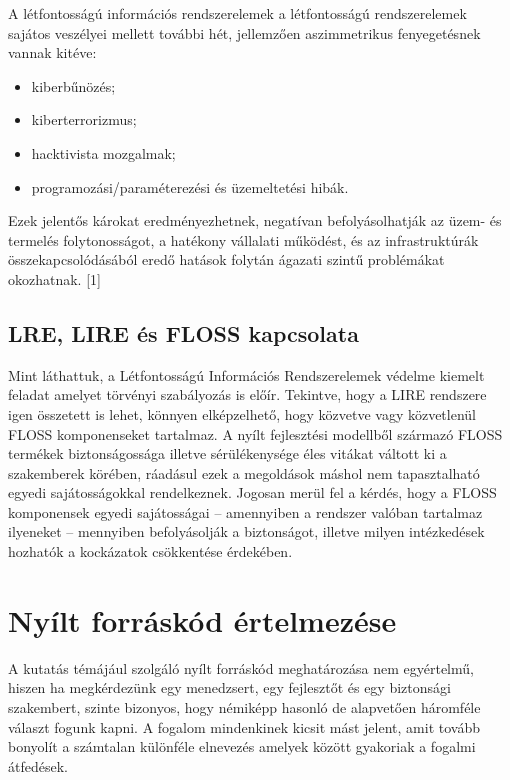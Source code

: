 \documentclass[12pt,magyar,a4paper,oneside]{scrreprt}
\providecommand{\tightlist}{%
  \setlength{\itemsep}{0pt}\setlength{\parskip}{0pt}}
\begin{document}
A létfontosságú információs rendszerelemek a létfontosságú
rendszerelemek sajátos veszélyei mellett további hét, jellemzően
aszimmetrikus fenyegetésnek vannak kitéve:

\begin{itemize}
\tightlist
\item
  kiberbűnözés;
\item
  kiberterrorizmus;
\item
  hacktivista mozgalmak;
\item
  programozási/paraméterezési és üzemeltetési hibák.
\end{itemize}

Ezek jelentős károkat eredményezhetnek, negatívan befolyásolhatják az
üzem- és termelés folytonosságot, a hatékony vállalati működést, és az
infrastruktúrák összekapcsolódásából eredő hatások folytán ágazati
szintű problémákat okozhatnak. {[}1{]}

\hypertarget{lre-lire-uxe9s-floss-kapcsolata}{%
\subsection{LRE, LIRE és FLOSS
kapcsolata}\label{lre-lire-uxe9s-floss-kapcsolata}}

Mint láthattuk, a Létfontosságú Információs Rendszerelemek védelme
kiemelt feladat amelyet törvényi szabályozás is előír. Tekintve, hogy a
LIRE rendszere igen összetett is lehet, könnyen elképzelhető, hogy
közvetve vagy közvetlenül FLOSS komponenseket tartalmaz. A nyílt
fejlesztési modellből származó FLOSS termékek biztonságossága illetve
sérülékenysége éles vitákat váltott ki a szakemberek körében, ráadásul
ezek a megoldások máshol nem tapasztalható egyedi sajátosságokkal
rendelkeznek. Jogosan merül fel a kérdés, hogy a FLOSS komponensek
egyedi sajátosságai -- amennyiben a rendszer valóban tartalmaz ilyeneket
-- mennyiben befolyásolják a biztonságot, illetve milyen intézkedések
hozhatók a kockázatok csökkentése érdekében.

\hypertarget{sec:WhatIsFLOSS}{%
\section{Nyílt forráskód értelmezése}\label{sec:WhatIsFLOSS}}

A kutatás témájául szolgáló nyílt forráskód meghatározása nem
egyértelmű, hiszen ha megkérdezünk egy menedzsert, egy fejlesztőt és egy
biztonsági szakembert, szinte bizonyos, hogy némiképp hasonló de
alapvetően háromféle választ fogunk kapni. A fogalom mindenkinek kicsit
mást jelent, amit tovább bonyolít a számtalan különféle elnevezés
amelyek között gyakoriak a fogalmi átfedések.
\end{document}
